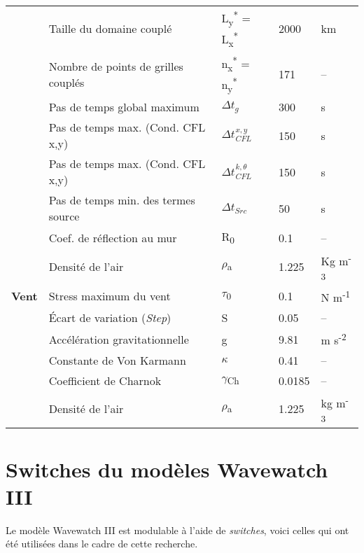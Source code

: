 \documentclass[10pt]{report}
\numberwithin{equation}{section}
\newcommand{\pt}{\hspace{1pt}} %
\begin{document}
\begin{center}
\begin{tabular}{lllll}
 & Taille du domaine couplé & L\textsubscript{y}\textsuperscript{*} = L\textsubscript{x}\textsuperscript{*} & 2000 & km\\[0pt]
 & Nombre de points de grilles couplés & n\textsubscript{x}\textsuperscript{*} = n\textsubscript{y}\textsuperscript{*} & 171 & --\\[0pt]
 & Pas de temps global maximum & \(\Delta t_g\) & 300 & s\\[0pt]
 & Pas de temps max. (Cond. CFL x,y) & \(\Delta t_{\pt CFL}^{\pt x,y}\) & 150 & s\\[0pt]
 & Pas de temps max. (Cond. CFL x,y) & \(\Delta t_{\pt CFL}^{\pt k,\theta}\) & 150 & s\\[0pt]
 & Pas de temps min. des termes source & \(\Delta t_{Src}\) & 50 & s\\[0pt]
 & Coef. de réflection au mur & R\textsubscript{0} & 0.1 & --\\[0pt]
 & Densité de l'air & \(\rho\)\textsubscript{a} & 1.225 & Kg m\textsuperscript{-3}\\[0pt]
\hline
\textbf{Vent} & Stress maximum du vent & \(\tau\)\textsubscript{0} & 0.1 & N m\textsuperscript{-1}\\[0pt]
 & Écart de variation (\emph{Step}) & S & 0.05 & --\\[0pt]
 & Accélération gravitationnelle & g & 9.81 & m s\textsuperscript{-2}\\[0pt]
 & Constante de Von Karmann & \(\kappa\) & 0.41 & --\\[0pt]
 & Coefficient de Charnok & \(\gamma\)\textsubscript{Ch} & 0.0185 & --\\[0pt]
 & Densité de l'air & \(\rho\)\textsubscript{a} & 1.225 & kg m\textsuperscript{-3}\\[0pt]
\hline
\end{tabular}
\end{center}




\section{Switches du modèles Wavewatch III}
\label{sec:orgbe9ae1d}

Le modèle Wavewatch III est modulable à l'aide de \emph{switches}, voici celles qui ont été utilisées dans le cadre de cette recherche. 
\end{document}
